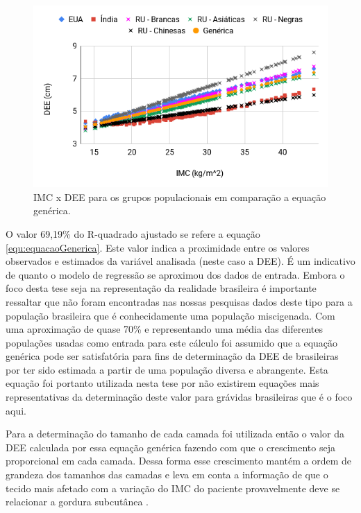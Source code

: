 \begin{figure}[ht!]
    \centering
    \includegraphics[width=0.9\linewidth]{capitulos/figuras/IMC versus DEE grupos populacionais e Equacao Generica.png} 
    \caption{\acrshort{IMC} x \acrshort{DEE} para os grupos populacionais em comparação a equação genérica.}
    \label{fig:imcDEEPopulacoesComparativoEquacaoGenerica}
\end{figure}

O valor 69,19\% do R-quadrado ajustado se refere a equação \ref{equ:equacaoGenerica}. Este valor indica a proximidade entre os valores observados e estimados da variável analisada (neste caso a \acrshort{DEE}). É um indicativo de quanto o modelo de regressão se aproximou dos dados de entrada. Embora o foco desta tese seja na representação da realidade brasileira é importante ressaltar que não foram encontradas nas nossas pesquisas dados deste tipo para a população brasileira que é conhecidamente uma população miscigenada.  Com uma aproximação de quase 70\% e representando uma média das diferentes populações usadas como entrada para este cálculo foi assumido que a equação genérica pode ser satisfatória para fins de determinação da \acrshort{DEE} de brasileiras por ter sido estimada a partir de uma população diversa e abrangente. Esta equação foi portanto utilizada nesta tese por não existirem equações mais representativas da determinação deste valor para grávidas brasileiras que é o foco aqui.

Para a determinação do tamanho de cada camada foi utilizada então o valor da \acrshort{DEE} calculada por essa equação genérica fazendo com que o crescimento seja proporcional em cada camada. Dessa forma esse crescimento mantém a ordem de grandeza dos tamanhos das camadas e leva em conta a informação de que o tecido mais afetado com a variação do \acrshort{IMC} do paciente provavelmente deve se relacionar a gordura subcutânea \cite{Palmer1983}.

